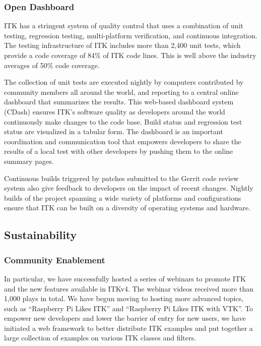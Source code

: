 \documentclass{frontiersENG} %
\begin{document}
\subsubsection{Open Dashboard} ITK has a stringent system of quality control
that uses a combination of unit testing, regression testing, multi-platform
verification, and continuous integration. The testing infrastructure of ITK
includes more than 2,400 unit tests, which provide a code coverage of 84\% of
ITK code lines. This is well above the industry averages of 50\% code coverage.

The collection of unit tests are executed nightly by computers contributed by
community members all around the world, and reporting to a central online
dashboard that summarizes the results. This web-based dashboard system (CDash)
\cite{ITK dashboard} ensures ITK’s software quality as developers around the
world continuously make changes to the code base. Build status and regression
test status are visualized in a tabular form. The dashboard is an important
coordination and communication tool that empowers developers to share the
results of a local test with other developers by pushing them to the online
summary pages.

Continuous builds triggered by patches submitted to the Gerrit code review
system also give feedback to developers on the impact of recent changes.
Nightly builds of the project spanning a wide variety of platforms and
configurations ensure that ITK can be built on a diversity of operating systems
and hardware.



\subsection{Sustainability}

\subsubsection{Community Enablement}

In particular, we have successfully hosted a series of webinars to promote ITK
and the new features available in ITKv4. The webinar videos received more than
1,000 plays in total. We have begun moving to hosting more advanced topics,
such as “Raspberry Pi Likes ITK” and “Raspberry Pi Likes ITK with VTK”. To
empower new developers and lower the barrier of entry for new users, we have
initiated a web framework to better distribute ITK examples and put together a
large collection of examples on various ITK classes and filters.
\end{document}
